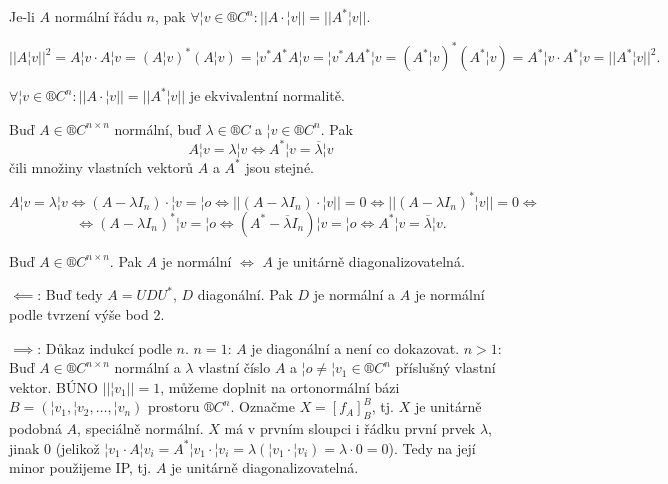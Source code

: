\documentclass[12pt]{article}                   %
\begin{document}
    \begin{tvrzeni}
        Je-li $A$ normální řádu $n$, pak $\forall ¦v \in ®C^n: ||A·¦v|| = ||A^*¦v||$.

        \begin{dukazin}
                $$ ||A¦v||^2 = A¦v·A¦v = (A¦v)^*(A¦v) = ¦v^*A^*A¦v = ¦v^*AA^*¦v = (A^*¦v)^*(A^*¦v) = A^*¦v·A^*¦v = ||A^*¦v||^2. $$ 
        \end{dukazin}
    \end{tvrzeni}

    \begin{poznamka}
        $\forall ¦v \in ®C^n: ||A·¦v|| = ||A^*¦v||$ je ekvivalentní normalitě.
    \end{poznamka}

    \begin{tvrzeni}
        Buď $A \in ®C^{n \times n}$ normální, buď $\lambda \in ®C$ a $¦v \in ®C^n$. Pak
        $$ A¦v = \lambda¦v \Leftrightarrow A^*¦v = \overline{\lambda}¦v $$ 
        čili množiny vlastních vektorů $A$ a $A^*$ jsou stejné.

        \begin{dukazin}
            $$ A¦v = \lambda ¦v \Leftrightarrow (A - \lambda I_n)·¦v = ¦o \Leftrightarrow ||(A - \lambda I_n)·¦v|| = 0 \Leftrightarrow ||(A - \lambda I_n)^*¦v|| = 0 \Leftrightarrow $$
            $$ \Leftrightarrow (A - \lambda I_n)^*¦v = ¦o \Leftrightarrow (A^* - \overline{\lambda}I_n)¦v = ¦o \Leftrightarrow A^*¦v = \overline{\lambda}¦v. $$
        \end{dukazin}
    \end{tvrzeni}

    \begin{veta}
        Buď $A \in ®C^{n \times n}$. Pak $A$ je normální $\Leftrightarrow$ $A$ je unitárně diagonalizovatelná.

        \begin{dukazin}
            $\impliedby$: Buď tedy $A = UDU^*$, $D$ diagonální. Pak $D$ je normální a $A$ je normální podle tvrzení výše bod 2.

            $\implies$: Důkaz indukcí podle $n$. $n = 1$: $A$ je diagonální a není co dokazovat. $n > 1:$ Buď $A \in ®C^{n \times n}$ normální a $\lambda$ vlastní číslo $A$ a $¦o ≠ ¦v_1 \in ®C^n$ příslušný vlastní vektor. BÚNO $||¦v_1|| = 1$, můžeme doplnit na ortonormální bázi $B = (¦v_1, ¦v_2, …, ¦v_n)$ prostoru $®C^n$. Označme $X = [f_A]_B^B$, tj. $X$ je unitárně podobná $A$, speciálně normální. $X$ má v prvním sloupci i řádku první prvek $\lambda$, jinak 0 (jelikož $¦v_1·A¦v_i = A^*¦v_1·¦v_i = \lambda(¦v_1·¦v_i) = \lambda·0 = 0$). Tedy na její minor použijeme IP, tj. $A$ je unitárně diagonalizovatelná.
        \end{dukazin}
    \end{veta}
\end{document}
